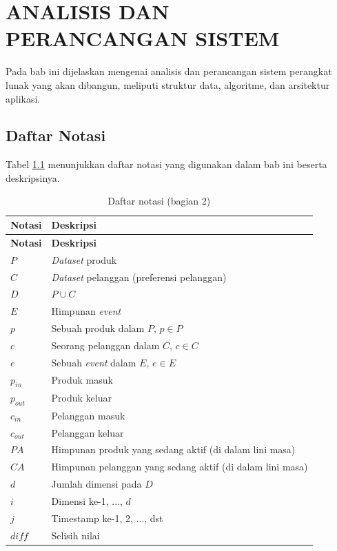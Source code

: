 \chapter{ANALISIS DAN PERANCANGAN SISTEM} \label{chap:analisis-perancangan-sistem}
\tab Pada bab ini dijelaskan mengenai analisis dan perancangan sistem perangkat lunak yang akan dibangun, meliputi struktur data, algoritme, dan arsitektur aplikasi. 

\section{Daftar Notasi}
\tab Tabel \ref{tab:daftar-notasi-2} menunjukkan daftar notasi yang digunakan dalam bab ini beserta deskripsinya.

\begin{longtable}{| p{3cm} | p{6cm} |} 
	\caption{Daftar notasi (bagian 2) \label{tab:daftar-notasi-2}}\\
	\hline
	\textbf{Notasi} & \textbf{Deskripsi}\\ \hline
	\endfirsthead
	\hline
	\textbf{Notasi} & \textbf{Deskripsi}\\ \hline
	\endhead
	$P$ & \textit{Dataset} produk\\ \hline
	$C$ & \textit{Dataset} pelanggan (preferensi pelanggan)\\ \hline
	$D$ & $P \cup C$ \\ \hline
	$E$ & Himpunan \textit{event} \\ \hline
	$p$ & Sebuah produk dalam $P$, $p \in P$\\ \hline
	$c$ & Seorang pelanggan dalam $C$, $c \in C$\\ \hline
	$e$ & Sebuah \textit{event} dalam $E$, $e \in E$ \\ \hline
	$p_{in}$ & Produk masuk \\ \hline
	$p_{out}$ & Produk keluar \\ \hline
	$c_{in}$ & Pelanggan masuk \\ \hline
	$c_{out}$ & Pelanggan keluar \\ \hline
	$PA$ & Himpunan produk yang sedang aktif (di dalam lini masa) \\ \hline	
	$CA$ & Himpunan pelanggan yang sedang aktif (di dalam lini masa) \\ \hline
	$d$ & Jumlah dimensi pada $D$\\ \hline
	$i$ & Dimensi ke-1, ..., $d$\\ \hline
	$j$ & Timestamp ke-1, 2, ..., dst\\ \hline
	$diff$ & Selisih nilai \\ \hline

\end{longtable}
